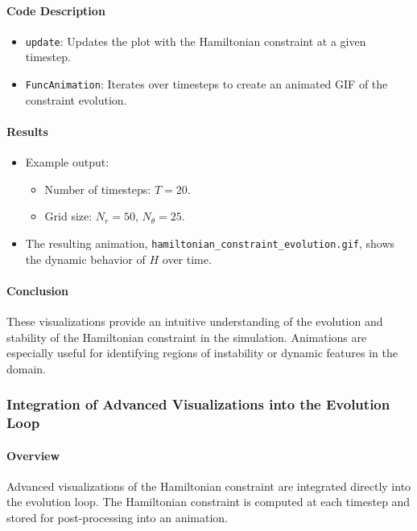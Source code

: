 \documentclass[12pt]{article}
\begin{document}
\paragraph{Code Description}
\begin{itemize}
    \item \texttt{update}: Updates the plot with the Hamiltonian constraint at a given timestep.
    \item \texttt{FuncAnimation}: Iterates over timesteps to create an animated GIF of the constraint evolution.
\end{itemize}

\paragraph{Results}
\begin{itemize}
    \item Example output:
    \begin{itemize}
        \item Number of timesteps: $T = 20$.
        \item Grid size: $N_r = 50$, $N_\theta = 25$.
    \end{itemize}
    \item The resulting animation, \texttt{hamiltonian\_constraint\_evolution.gif}, shows the dynamic behavior of $H$ over time.
\end{itemize}

\paragraph{Conclusion}
These visualizations provide an intuitive understanding of the evolution and stability of the Hamiltonian constraint in the simulation. Animations are especially useful for identifying regions of instability or dynamic features in the domain.

\subsubsection{Integration of Advanced Visualizations into the Evolution Loop}

\paragraph{Overview}
Advanced visualizations of the Hamiltonian constraint are integrated directly into the evolution loop. The Hamiltonian constraint is computed at each timestep and stored for post-processing into an animation.
\end{document}
